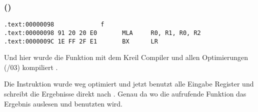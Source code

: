 ﻿\subsubsection{\OptimizingKeilVI (\ARMMode)}

\begin{lstlisting}[label=ARM_leaf_example1,style=customasmARM]
.text:00000098             f
.text:00000098 91 20 20 E0       MLA     R0, R1, R0, R2
.text:0000009C 1E FF 2F E1       BX      LR
\end{lstlisting}


Und hier wurde die \ttf Funktion mit dem Kreil Compiler und allen Optimierungen (/03) kompiliert .

Die \MOV Instruktion wurde weg optimiert und jetzt benutzt  alle Eingabe 
Register und schreibt die Ergebnisse direkt nach . Genau da wo die 
aufrufende Funktion das Ergebnis auslesen und benutzten wird.



